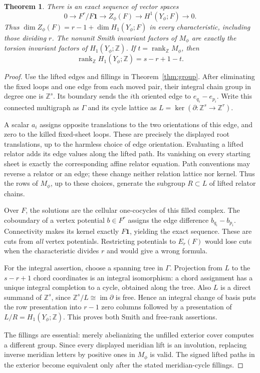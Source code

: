 \documentclass[11pt]{article}
\newtheorem{theorem}{Theorem}
\newcommand{\rk}{\operatorname{rank}}
\newcommand{\Z}{\mathbb Z}
\begin{document}
\begin{theorem}\label{thm:homology}
There is an exact sequence of vector spaces
\[
 0\longrightarrow F^r/F\mathbf1
   \longrightarrow Z_\phi(F)
   \longrightarrow H^1(Y_\phi;F)\longrightarrow0.
\]
Thus $\dim Z_\phi(F)=r-1+\dim H_1(Y_\phi;F)$ in every characteristic,
including those dividing $r$. The nonunit Smith invariant factors of
$M_\phi$ are exactly the torsion invariant factors of
$H_1(Y_\phi;\Z)$. If $t=\rk_\Z M_\phi$, then
\[
       \rk_\Z H_1(Y_\phi;\Z)=s-r+1-t.
\]
\end{theorem}
\begin{proof}
Use the lifted edges and fillings in Theorem~\ref{thm:group}. After
eliminating the fixed loops and one edge from each moved pair, their
integral chain group in degree one is $\Z^s$. Its boundary sends the
$i$th oriented edge to $e_{q_i}-e_{p_i}$. Write this connected
multigraph as $\Gamma$ and its cycle lattice as
$L=\ker(\partial:\Z^s\to\Z^r)$.

A scalar $a_i$ assigns opposite translations to the two orientations
of this edge, and zero to the killed fixed-sheet loops. These are
precisely the displayed root translations, up to the harmless choice
of edge orientation. Evaluating a lifted relator adds its edge values
along the lifted path. Its vanishing on every starting sheet is
exactly the corresponding affine relator equation. Path conventions
may reverse a relator or an edge; these change neither relation lattice
nor kernel. Thus the rows of $M_\phi$, up to these choices, generate
the subgroup $R\subset L$ of lifted relator chains.

Over $F$, the solutions are the cellular one-cocycles of this filled
complex. The coboundary of a vertex potential $b\in F^r$ assigns the
edge difference $b_{q_i}-b_{p_i}$. Connectivity makes its kernel
exactly $F\mathbf1$, yielding the exact sequence. These are cuts from
\emph{all} vertex potentials. Restricting potentials to $E_r(F)$ would
lose cuts when the characteristic divides $r$ and would give a wrong
formula.

For the integral assertion, choose a spanning tree in $\Gamma$.
Projection from $L$ to the $s-r+1$ chord coordinates is an integral
isomorphism: a chord assignment has a unique integral completion to a
cycle, obtained along the tree. Also $L$ is a direct summand of
$\Z^s$, since $\Z^s/L\cong\operatorname{im}\partial$ is free. Hence an
integral change of basis puts the row presentation into $r-1$ zero
columns followed by a presentation of $L/R=H_1(Y_\phi;\Z)$. This proves
both Smith and free-rank assertions.

The fillings are essential: merely abelianizing the unfilled exterior
cover computes a different group. Since every displayed meridian lift
is an involution, replacing inverse meridian letters by positive ones
in $M_\phi$ is valid. The signed lifted paths in the exterior become
equivalent only after the stated meridian-cycle fillings.
\end{proof}
\end{document}
